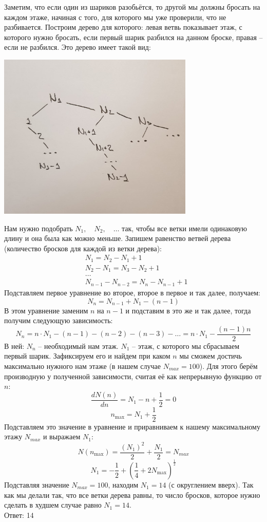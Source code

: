\documentclass[a4paper,12pt]{article} %
\begin{document}
Заметим, что если один из шариков разобьётся, то другой мы должны бросать на каждом этаже, начиная с того, для которого мы уже проверили, что не разбивается. Построим дерево для которого: левая ветвь показывает этаж, с которого нужно бросать, если первый шарик разбился на данном броске, правая -- если не разбился. Это дерево имеет такой вид: 
\begin{center}
\includegraphics[width=0.7\textwidth]{tree_7}
\end{center}
Нам нужно подобрать $N_1, \quad N_2, \quad \ldots $ так, чтобы все ветки имели одинаковую длину и она была как можно меньше. Запишем равенство ветвей дерева (количество бросков для каждой из ветки дерева):
$$
\begin{aligned}
&N_{1}=N_{2}-N_{1}+1\\
&N_{2}-N_{1}=N_{3}-N_{2}+1\\
& \ldots \\
&N_{n-1}-N_{n-2}=N_{n}-N_{n-1}+1
\end{aligned}
$$
Подставляем первое уравнение во второе, второе в первое и так далее, получаем: 
$$
N_{n}=N_{n-1}+N_{1}-(n-1)
$$
В этом уравнение заменим $ n $ на $ n - 1 $ и подставим в это же и так далее, тогда получим следующую зависимость:
$$
N_{n}=n \cdot N_{1}-(n-1)-(n-2)-(n-3)-\ldots=n \cdot N_{1}-\frac{(n-1) n}{2}
$$
В ней:  $ N_n $ -- необходимый нам этаж. $ N_1 $ -- этаж, с которого мы сбрасываем первый шарик. Зафиксируем его и найдем при каком $ n $ мы сможем достичь максимально нужного нам этаже (в нашем случае $ N_{max} = 100 $). Для этого берём производную у полученной зависимости, считая её как непрерывную функцию от $ n $: 
$$
\frac{d N(n)}{d n}=N_{1}-n+\frac{1}{2}=0
$$
$$
n_{\max }=N_{1}+\frac{1}{2}
$$
Подставляем это значение в уравнение и приравниваем к нашему максимальному этажу $ N_{max}$ и выражаем $ N_1 $:
$$
N\left(n_{\max }\right)=\frac{\left(N_{1}\right)^{2}}{2}+\frac{N_{1}}{2}=N_{max}
$$
$$
N_{1}=-\frac{1}{2}+\left(\frac{1}{4}+2 N_{\text {max}}\right)^{\frac{1}{2}}
$$
Подставляя значение  $ N_{max} = 100 $, находим $ N_1 = 14 $ (с округлением вверх). Так как мы делали так, что все ветки дерева равны, то число бросков, которое нужно сделать в худшем случае равно $ N_1 = 14 $.\\
Ответ: 14
\end{document}
